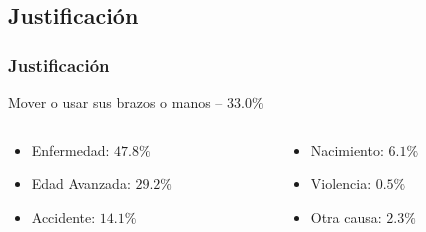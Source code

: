 \subsection{Justificaci\'on}
\begin{frame}
\frametitle{Justificaci\'on}

\begin{table}
\caption{Poblaci\'on con discapacidad en M\'exico, seg\'un distintas fuentes
 (Censo de Poblaci\'on y Vivienda de 2010, Encuesta Nacional de Ingresos y
 Gasto de los Hogares de 2012, Encuesta Nacional de la Din\'amica 
 Demogr\'afica 2014)\cite{Milosavljevic2014,INEGI2014}}
\label{PoblacionDis}
\end{table}

\vspace{-0.5cm}
\begin{block}{Mover o usar sus brazos o manos -- $33.0\%$}
\begin{columns}[T]
\begin{column}{.5\textwidth}
\begin{itemize}
\item {Enfermedad: $47.8\%$}
\item {Edad Avanzada: $29.2\%$}
\item {Accidente: $14.1\%$}
\end{itemize}
\end{column}

\begin{column}{.5\textwidth}
\begin{itemize}
\item {Nacimiento: $6.1\%$}
\item {Violencia: $0.5\%$}
\item {Otra causa: $2.3\%$}
\end{itemize}
\end{column}
\end{columns}
\end{block}

\end{frame}

